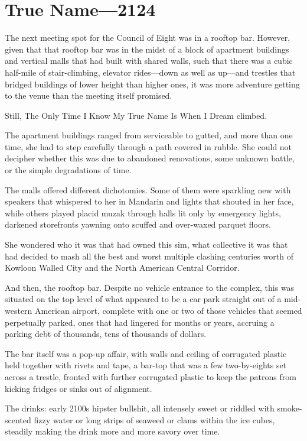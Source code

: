 \hypertarget{true-name-2124}{%
\chapter{True Name---2124}\label{true-name-2124}}

The next meeting spot for the Council of Eight was in a rooftop bar. However, given that that rooftop bar was in the midst of a block of apartment buildings and vertical malls that had built with shared walls, such that there was a cubic half-mile of stair-climbing, elevator rides---down as well as up---and trestles that bridged buildings of lower height than higher ones, it was more adventure getting to the venue than the meeting itself promised.

Still, The Only Time I Know My True Name Is When I Dream climbed.

The apartment buildings ranged from serviceable to gutted, and more than one time, she had to step carefully through a path covered in rubble. She could not decipher whether this was due to abandoned renovations, some unknown battle, or the simple degradations of time.

The malls offered different dichotomies. Some of them were sparkling new with speakers that whispered to her in Mandarin and lights that shouted in her face, while others played placid muzak through halls lit only by emergency lights, darkened storefronts yawning onto scuffed and over-waxed parquet floors.

She wondered who it was that had owned this sim, what collective it was that had decided to mash all the best and worst multiple clashing centuries worth of Kowloon Walled City and the North American Central Corridor.

And then, the rooftop bar. Despite no vehicle entrance to the complex, this was situated on the top level of what appeared to be a car park straight out of a mid-western American airport, complete with one or two of those vehicles that seemed perpetually parked, ones that had lingered for months or years, accruing a parking debt of thousands, tens of thousands of dollars.

The bar itself was a pop-up affair, with walls and ceiling of corrugated plastic held together with rivets and tape, a bar-top that was a few two-by-eights set across a trestle, fronted with further corrugated plastic to keep the patrons from kicking fridges or sinks out of alignment.

The drinks: early 2100s hipster bullshit, all intensely sweet or riddled with smoke-scented fizzy water or long strips of seaweed or clams within the ice cubes, steadily making the drink more and more savory over time.

